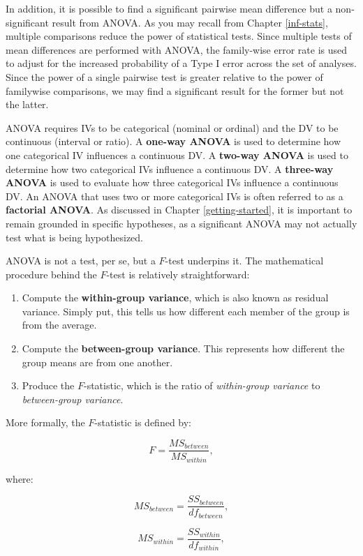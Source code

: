 \documentclass[
]{book}
\providecommand{\tightlist}{%
  \setlength{\itemsep}{0pt}\setlength{\parskip}{0pt}}
\begin{document}
In addition, it is possible to find a significant pairwise mean difference but a non-significant result from ANOVA. As you may recall from Chapter \ref{inf-stats}, multiple comparisons reduce the power of statistical tests. Since multiple tests of mean differences are performed with ANOVA, the family-wise error rate is used to adjust for the increased probability of a Type I error across the set of analyses. Since the power of a single pairwise test is greater relative to the power of familywise comparisons, we may find a significant result for the former but not the latter.

ANOVA requires IVs to be categorical (nominal or ordinal) and the DV to be continuous (interval or ratio). A \textbf{one-way ANOVA} is used to determine how one categorical IV influences a continuous DV. A \textbf{two-way ANOVA} is used to determine how two categorical IVs influence a continuous DV. A \textbf{three-way ANOVA} is used to evaluate how three categorical IVs influence a continuous DV. An ANOVA that uses two or more categorical IVs is often referred to as a \textbf{factorial ANOVA}. As discussed in Chapter \ref{getting-started}, it is important to remain grounded in specific hypotheses, as a significant ANOVA may not actually test what is being hypothesized.

ANOVA is not a test, per se, but a \(F\)-test underpins it. The mathematical procedure behind the \(F\)-test is relatively straightforward:

\begin{enumerate}
\def\labelenumi{\arabic{enumi}.}
\tightlist
\item
  Compute the \textbf{within-group variance}, which is also known as residual variance. Simply put, this tells us how different each member of the group is from the average.
\item
  Compute the \textbf{between-group variance}. This represents how different the group means are from one another.
\item
  Produce the \(F\)-statistic, which is the ratio of \emph{within-group variance} to \emph{between-group variance}.
\end{enumerate}

More formally, the \(F\)-statistic is defined by:

\[ F = \frac{MS_{between}}{MS_{within}}, \]

where:

\[ MS_{between} = \frac{SS_{between}}{df_{between}}, \]

\[ MS_{within} = \frac{SS_{within}}{df_{within}}, \]
\end{document}
